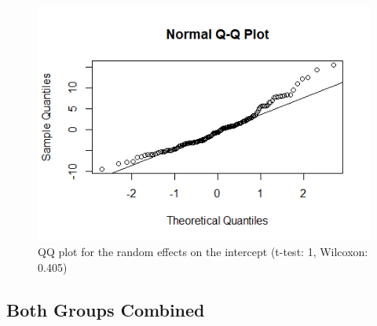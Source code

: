 \begin{figure}[H]
\centering
\includegraphics[width=0.4\linewidth]{../../plots/qq_intercept_treatment.png}
\caption{QQ plot for the random effects on the intercept (t-test: 1, Wilcoxon: 0.405)}
\label{fig:re.control}
\end{figure}
\subsection{Both Groups Combined}
